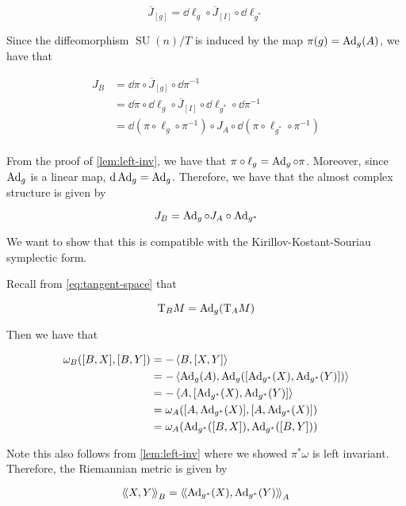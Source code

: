 \documentclass{article}
\DeclareMathOperator{\SU}{SU}
\renewcommand{\tilde}{\widetilde}
\newcommand{\iinner}[1]{\left\langle\!\left\langle #1 \right\rangle\!\right\rangle}
\begin{document}
\begin{equation}
    \label{eq:cx-str-quot}
    \overline J_{[g]} = \dd\ell_g \circ \overline J_{[I]} \circ \dd\ell_{g^*}
\end{equation}

Since the diffeomorphism \(\SU(n)/T\) is induced by the map \(\pi(g) = \operatorname{Ad}_g(A)\), we have that

\begin{align*}
    J_B &= \dd\pi \circ \overline J_{[g]} \circ \dd\pi^{-1} \\
    &= \dd\pi \circ \dd \ell_g \circ \overline J_{[I]} \circ \dd \ell_{g^*} \circ \dd \pi^{-1} \\
    &= \dd(\pi \circ \ell_g \circ \pi^{-1}) \circ J_A \circ \dd(\pi \circ \ell_{g^*} \circ \pi^{-1}) \\
\end{align*}

From the proof of \cref{lem:left-inv}, we have that \(\pi \circ \ell_g = \operatorname{Ad}_g \circ \pi\). Moreover, since \(\operatorname{Ad}_g\) is a linear map, \(\dd \operatorname{Ad}_g = \operatorname{Ad}_g\). Therefore, we have that the almost complex structure is given by

\[J_B = \operatorname{Ad}_g \circ J_A \circ \operatorname{Ad}_{g^*}\]

We want to show that this is compatible with the Kirillov-Kostant-Souriau symplectic form.

Recall from \cref{eq:tangent-space} that

\[\mathrm{T}_BM = \operatorname{Ad}_g(\mathrm{T}_A M)\]

Then we have that

\begin{align*}
    \omega_B([B, X], [B, Y]) &= -\left\langle B, [X, Y] \right\rangle \\
    &= -\left\langle \operatorname{Ad}_g(A), \operatorname{Ad}_g([\operatorname{Ad}_{g^*}(X), \operatorname{Ad}_{g^*}(Y)]) \right\rangle \\
    &= -\left\langle A, [\operatorname{Ad}_{g^*}(X), \operatorname{Ad}_{g^*}(Y)] \right\rangle \\
    &= \omega_A([A, \operatorname{Ad}_{g^*}(X)], [A, \operatorname{Ad}_{g^*}(X)]) \\
    &= \omega_A(\operatorname{Ad}_{g^*}([B, X]), \operatorname{Ad}_{g^*}([B, Y]))
\end{align*}

Note this also follows from \cref{lem:left-inv} where we showed \(\pi^*\omega\) is left invariant. Therefore, the Riemannian metric is given by

\[\iinner{X, Y}_B = \iinner{\Ad_{g^*}(X), \Ad_{g^*}(Y)}_A\]

\end{document}
